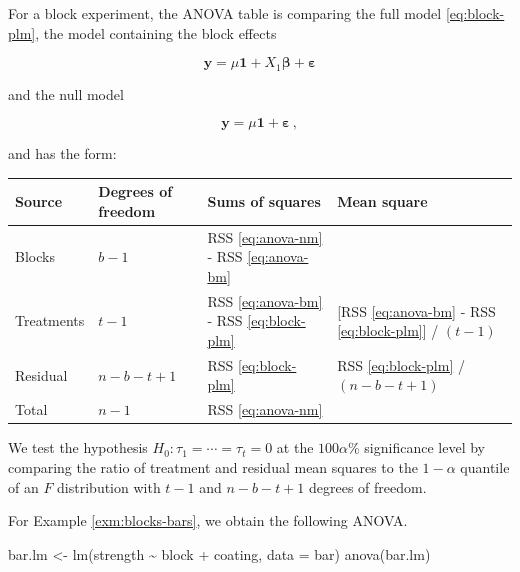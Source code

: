\documentclass[
]{book}
\newenvironment{Shaded}{\begin{snugshade}}{\end{snugshade}}
\newcommand{\AttributeTok}[1]{\textcolor[rgb]{0.77,0.63,0.00}{#1}}
\newcommand{\FunctionTok}[1]{\textcolor[rgb]{0.00,0.00,0.00}{#1}}
\newcommand{\NormalTok}[1]{#1}
\newcommand{\OtherTok}[1]{\textcolor[rgb]{0.56,0.35,0.01}{#1}}
\newcommand{\SpecialCharTok}[1]{\textcolor[rgb]{0.00,0.00,0.00}{#1}}
\theoremstyle{definition}
\theoremstyle{definition}
\theoremstyle{definition}
\theoremstyle{definition}
\theoremstyle{remark}
\begin{document}
For a block experiment, the ANOVA table is comparing the full model \eqref{eq:block-plm}, the model containing the block effects

\begin{equation}
\boldsymbol{y}= \mu\boldsymbol{1} + X_1\boldsymbol{\beta} + \boldsymbol{\varepsilon}
\label{eq:anova-bm}
\end{equation}

and the null model

\begin{equation}
\boldsymbol{y}= \mu\boldsymbol{1} + \boldsymbol{\varepsilon}\,,
\label{eq:anova-nm}
\end{equation}

and has the form:

\begin{longtable}[]{@{}
  >{\raggedright\arraybackslash}p{}
  >{\centering\arraybackslash}p{}
  >{\raggedright\arraybackslash}p{}
  >{\raggedright\arraybackslash}p{}@{}}
\toprule
Source & Degrees of freedom & Sums of squares & Mean square \\
\midrule
\endhead
Blocks & \(b-1\) & RSS \eqref{eq:anova-nm} - RSS \eqref{eq:anova-bm} & \\
Treatments & \(t-1\) & RSS \eqref{eq:anova-bm} - RSS \eqref{eq:block-plm} & {[}RSS \eqref{eq:anova-bm} - RSS \eqref{eq:block-plm}{]} / \((t-1)\) \\
Residual & \(n - b - t + 1\) & RSS \eqref{eq:block-plm} & RSS \eqref{eq:block-plm} / \((n - b - t + 1)\) \\
Total & \(n - 1\) & RSS \eqref{eq:anova-nm} & \\
\bottomrule
\end{longtable}

We test the hypothesis \(H_0: \tau_1 = \cdots = \tau_t = 0\) at the \(100\alpha\)\% significance level by comparing the ratio of treatment and residual mean squares to the \(1-\alpha\) quantile of an \(F\) distribution with \(t-1\) and \(n-b-t+1\) degrees of freedom.

For Example \ref{exm:blocks-bars}, we obtain the following ANOVA.

\begin{Shaded}
\begin{Highlighting}[]
\NormalTok{bar.lm }\OtherTok{\textless{}{-}} \FunctionTok{lm}\NormalTok{(strength }\SpecialCharTok{\textasciitilde{}}\NormalTok{ block }\SpecialCharTok{+}\NormalTok{ coating, }\AttributeTok{data =}\NormalTok{ bar)}
\FunctionTok{anova}\NormalTok{(bar.lm)}
\end{Highlighting}
\end{Shaded}
\end{document}
